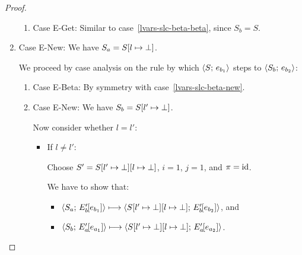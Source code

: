 \begin{proof}
\begin{enumerate}
\begin{enumerate}
    \item \label{lvars-slc-beta-get}Case {\sc E-Get}: Similar to
      case~\ref{lvars-slc-beta-beta}, since $S_b = S$.

    \end{enumerate}
  \item Case {\sc E-New}: We have $S_a = S[l \mapsto \bot]$.

    We proceed by case analysis on the rule by which
    $\langle S;\, e_{b_1} \rangle$ steps to $\langle S_b;\, e_{b_2} \rangle$:
    \begin{enumerate}
    \item \label{lvars-slc-new-beta}Case {\sc E-Beta}: By symmetry with case~\ref{lvars-slc-beta-new}.
    \item \label{lvars-slc-new-new}Case {\sc E-New}: We have $S_b = S[l' \mapsto \bot]$.

      Now consider whether $l = l'$:
      \begin{itemize}
        \item If $l \neq l'$:

          Choose $S' = S[l' \mapsto \bot][l \mapsto \bot]$, $i =
          1$, $j = 1$, and $\pi = \mathrm{id}$.

          We have to show that:
          \begin{itemize}
          \item
            $\langle S_a;\, E'_b\hspace{-1mm}\left[e_{b_1}\right] \rangle
            \longmapsto
            \langle S[l' \mapsto \bot][l \mapsto \bot];\, E'_b\hspace{-1mm}\left[e_{b_2}\right] \rangle$,
            and
          \item
            $\langle S_b;\, E'_a\hspace{-1mm}\left[e_{a_1}\right] \rangle
            \longmapsto
            \langle S[l' \mapsto \bot][l \mapsto \bot];\, E'_a\hspace{-1mm}\left[e_{a_2}\right] \rangle$.
          \end{itemize}


\end{itemize}
\end{enumerate}
\end{enumerate}
\end{proof}
